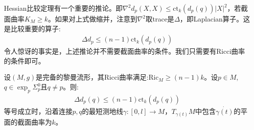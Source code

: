 Hessian比较定理有一个重要的推论。即$\nabla^2 d_p(X,X)\leq \mathrm{ct}_k(d_p(q))|X|^2$，若截面曲率$K_M \geq k$。如果对上式做缩并，注意到$\nabla^2$取trace是$\Delta$，即Laplacian算子。这是比较重要的算子:
\begin{align*}
    \Delta d_p \leq (n-1)\mathrm{ct}_k(d_p(q))
\end{align*}
令人惊讶的事实是，上述推论并不需要截面曲率的条件。我们只需要有Ricci曲率的条件即可。
\begin{theorem}[Laplacian比较定理]
    设$(M,g)$是完备的黎曼流形，其Ricci曲率满足:$\mathrm{Ric}_M\geq (n-1)k$。设$p \in M$,$q \in \exp_p \Sigma_p^0$且$q \neq p$。则:
    \begin{align*}
        \Delta d_p(q) \leq (n-1)\mathrm{ct}_k(d_p(q))
    \end{align*}
    等号成立时，沿着连接$p,q$的最短测地线$\gamma:[0,l]\to M$，$T_{\gamma(t)}M$中包含$\dot{\gamma(t)}$的平面的截面曲率为$k$。
\end{theorem}
